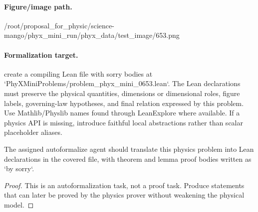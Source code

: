 \paragraph{Figure/image path.}
/root/proposal\_for\_physic/science-mango/phyx\_mini\_run/phyx\_data/test\_image/653.png

\paragraph{Formalization target.}
create a compiling Lean file with sorry bodies at `PhyXMiniProblems/problem\_phyx\_mini\_0653.lean`. The Lean declarations must preserve the physical quantities, dimensions or dimensional roles, figure labels, governing-law hypotheses, and final relation expressed by this problem.
Use Mathlib/Physlib names found through LeanExplore where available. If a physics API is missing, introduce faithful local abstractions rather than scalar placeholder aliases.

\begin{theorem}
\label{thm:physics:phyx_mini_0653:target}
The assigned autoformalize agent should translate this physics problem into Lean declarations in the covered file, with theorem and lemma proof bodies written as `by sorry`.
\end{theorem}
\begin{proof}
This is an autoformalization task, not a proof task. Produce statements that can later be proved by the physics prover without weakening the physical model.
\end{proof}

